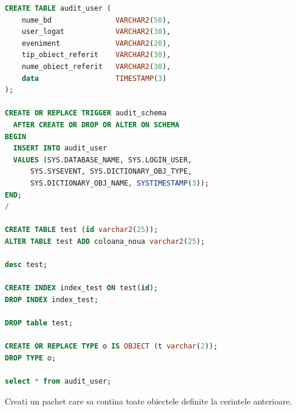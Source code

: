 \documentclass[12pt, a4paper]{article}
\begin{document}
\begin{lstlisting}[language=SQL]
CREATE TABLE audit_user (
    nume_bd               VARCHAR2(50), 
    user_logat            VARCHAR2(30), 
    eveniment             VARCHAR2(20), 
    tip_obiect_referit    VARCHAR2(30), 
    nume_obiect_referit   VARCHAR2(30), 
    data                  TIMESTAMP(3)
); 

CREATE OR REPLACE TRIGGER audit_schema 
  AFTER CREATE OR DROP OR ALTER ON SCHEMA 
BEGIN 
  INSERT INTO audit_user 
  VALUES (SYS.DATABASE_NAME, SYS.LOGIN_USER,  
      SYS.SYSEVENT, SYS.DICTIONARY_OBJ_TYPE,  
      SYS.DICTIONARY_OBJ_NAME, SYSTIMESTAMP(3)); 
END; 
/

CREATE TABLE test (id varchar2(25));
ALTER TABLE test ADD coloana_noua varchar2(25);

desc test;

CREATE INDEX index_test ON test(id);
DROP INDEX index_test;

DROP table test;

CREATE OR REPLACE TYPE o IS OBJECT (t varchar(2));
DROP TYPE o;

select * from audit_user;
\end{lstlisting}

Creati un pachet care sa contina toate obiectele definite la cerintele anterioare.
\end{document}
